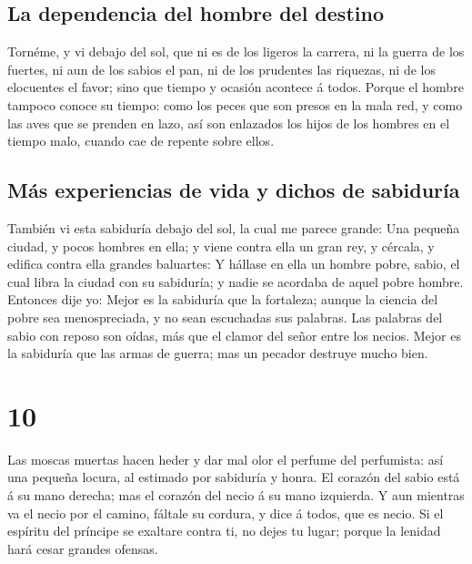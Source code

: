 \hypertarget{la-dependencia-del-hombre-del-destino}{%
\subsection{La dependencia del hombre del
destino}\label{la-dependencia-del-hombre-del-destino}}

 Tornéme, y vi debajo del sol, que ni es de los ligeros
la carrera, ni la guerra de los fuertes, ni aun de los sabios el pan, ni
de los prudentes las riquezas, ni de los elocuentes el favor; sino que
tiempo y ocasión acontece á todos.  Porque el hombre
tampoco conoce su tiempo: como los peces que son presos en la mala red,
y como las aves que se prenden en lazo, así son enlazados los hijos de
los hombres en el tiempo malo, cuando cae de repente sobre ellos.

\hypertarget{muxe1s-experiencias-de-vida-y-dichos-de-sabiduruxeda}{%
\subsection{Más experiencias de vida y dichos de
sabiduría}\label{muxe1s-experiencias-de-vida-y-dichos-de-sabiduruxeda}}

 También vi esta sabiduría debajo del sol, la cual me
parece grande:  Una pequeña ciudad, y pocos hombres en
ella; y viene contra ella un gran rey, y cércala, y edifica contra ella
grandes baluartes:  Y hállase en ella un hombre pobre,
sabio, el cual libra la ciudad con su sabiduría; y nadie se acordaba de
aquel pobre hombre.  Entonces dije yo: Mejor es la
sabiduría que la fortaleza; aunque la ciencia del pobre sea
menospreciada, y no sean escuchadas sus palabras.  Las
palabras del sabio con reposo son oídas, más que el clamor del señor
entre los necios.  Mejor es la sabiduría que las armas de
guerra; mas un pecador destruye mucho bien.

\hypertarget{section-21-10}{%
\section{10}\label{section-21-10}}

 Las moscas muertas hacen heder y dar mal olor el perfume
del perfumista: así una pequeña locura, al estimado por sabiduría y
honra.  El corazón del sabio está á su mano derecha; mas
el corazón del necio á su mano izquierda.  Y aun mientras
va el necio por el camino, fáltale su cordura, y dice á todos, que es
necio.  Si el espíritu del príncipe se exaltare contra ti,
no dejes tu lugar; porque la lenidad hará cesar grandes ofensas.

